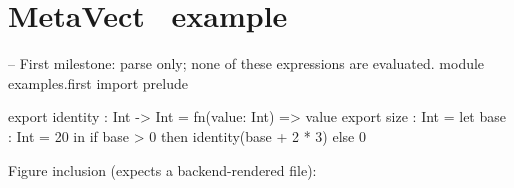 \documentclass{article}
\begin{document}
\section*{MetaVect \MetaVectVersion\ example}

\begin{metavectcode}
-- First milestone: parse only; none of these expressions are evaluated.
module examples.first
import prelude

export identity : Int -> Int = fn(value: Int) => value
export size : Int = let base : Int = 20 in
    if base > 0 then identity(base + 2 * 3) else 0
\end{metavectcode}

Figure inclusion (expects a backend-rendered file):
\begin{center}
\end{center}
\end{document}
